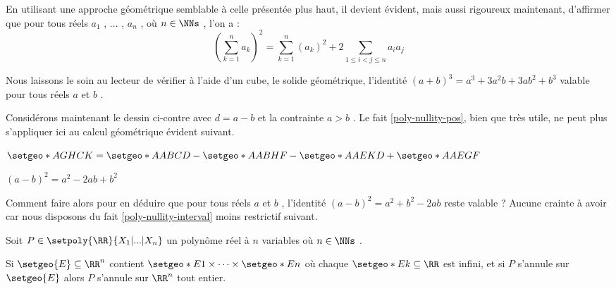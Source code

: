 

\begin{example}
	En utilisant une approche géométrique semblable à celle présentée plus haut, il devient évident, mais aussi rigoureux maintenant, d'affirmer que pour tous réels $a_1$ , ... , $a_n$ , où $n \in \NNs$ , l'on a :
\[
	\left( \sum_{k=1}^{n}a_k \right)^2
	=
	\sum_{k=1}^{n} \left( a_k \right)^2
	+
	2 \sum_{1 \leq i < j \leq n} a_i a_j
\]
\end{example}




\begin{example}
	Nous laissons le soin au lecteur de vérifier à l'aide d'un cube, le solide géométrique, l'identité $(a + b)^3 = a^3 + 3 a^2 b + 3 a b^2 + b^3$ valable pour tous réels $a$ et $b$ .
\end{example}




\medskip


\begin{figure} 
	\vspace{-.5em}
	\begin{center}
	\end{center}
	\vspace{-1.25em}
\end{figure} 


Considérons maintenant le dessin ci-contre avec $d = a - b$ et la contrainte $a > b$ . Le fait \ref{poly-nullity-pos}, bien que très utile, ne peut plus s'appliquer ici au calcul géométrique évident suivant.

\smallskip

$\setgeo*{A}{GHCK} = \setgeo*{A}{ABCD} - \setgeo*{A}{ABHF} - \setgeo*{A}{AEKD} + \setgeo*{A}{AEGF}$
	
\smallskip
	
$(a-b)^2 = a^2 - 2ab + b^2$


\medskip

Comment faire alors pour en déduire que pour tous réels $a$ et $b$ , l'identité $(a - b)^2 = a^2 + b^2 - 2ab$ reste valable ?
Aucune crainte à avoir car nous disposons du fait \ref{poly-nullity-interval} moins restrictif suivant. 


\medskip

\begin{fact} \label{poly-nullity-interval}
	Soit $P \in \setpoly{\RR}{X_1 | ... | X_n}$ un polynôme réel à $n$ variables où $n \in \NNs$ .
	
	\smallskip
	
	Si $\setgeo{E} \subseteq \RR^n$ contient $\setgeo*{E}{1} \times \cdots \times \setgeo*{E}{n}$ où chaque $\setgeo*{E}{k} \subseteq \RR$ est infini,
	et si $P$ s'annule sur $\setgeo{E}$ alors $P$ s'annule sur $\RR^n$ tout entier. 
\end{fact}


